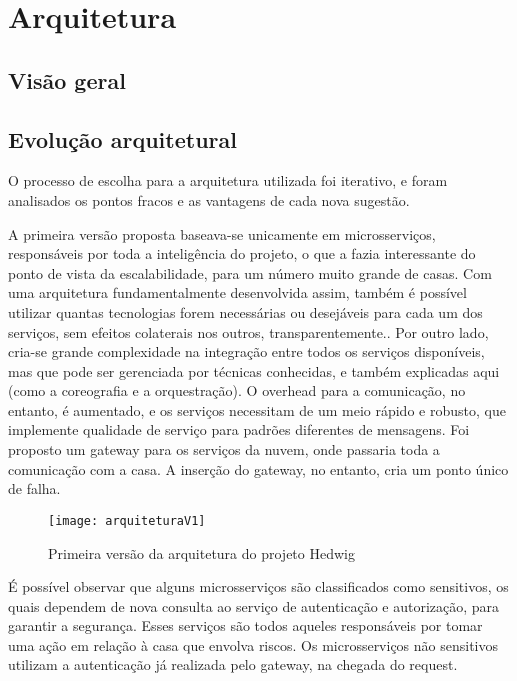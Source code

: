 \chapter{Arquitetura}

\section{Visão geral}

\section{Evolução arquitetural}
O processo de escolha para a arquitetura utilizada foi iterativo, e foram analisados os pontos fracos e as vantagens de cada nova sugestão.

A primeira versão proposta baseava-se unicamente em microsserviços, responsáveis por toda a inteligência do projeto, o que a fazia interessante do ponto de vista da escalabilidade, para um número muito grande de casas. Com uma arquitetura fundamentalmente desenvolvida assim, também é possível utilizar quantas tecnologias forem necessárias ou desejáveis para cada um dos serviços, sem efeitos colaterais nos outros, transparentemente.. Por outro lado, cria-se grande complexidade na integração entre todos os serviços disponíveis, mas que pode ser gerenciada por técnicas conhecidas, e também explicadas aqui (como a coreografia e a orquestração). O overhead para a comunicação, no entanto, é aumentado, e os serviços necessitam de um meio rápido e robusto, que implemente qualidade de serviço para padrões diferentes de mensagens. Foi proposto um gateway para os serviços da nuvem, onde passaria toda a comunicação com a casa. A inserção do gateway, no entanto, cria um ponto único de falha.

\begin{figure}[H]
	\centering
	\caption{Primeira versão da arquitetura do projeto Hedwig}
  \texttt{[image: arquiteturaV1]}
\label{fig:arquiteturaV1}
\end{figure}

É possível observar que alguns microsserviços são classificados como sensitivos, os quais dependem de nova consulta ao serviço de autenticação e  autorização, para garantir a segurança. Esses serviços são todos aqueles responsáveis por tomar uma ação em relação à casa que envolva riscos. Os microsserviços não sensitivos utilizam a autenticação já realizada pelo gateway, na chegada do request.

